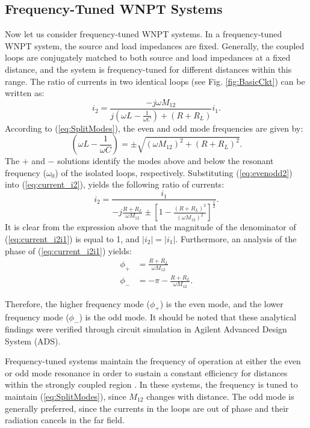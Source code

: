 \documentclass[journal]{IEEEtran}
\begin{document}
\subsection{Frequency-Tuned WNPT Systems}
\label{sec:FreqTune}

Now let us consider frequency-tuned WNPT systems. In a frequency-tuned WNPT system, the source and load impedances are fixed. Generally, the coupled loops are conjugately matched to both source and load impedances at a fixed distance, and the system is frequency-tuned for different distances within this range.
The ratio of currents in two identical loops (see Fig. \ref{fig:BasicCkt}) can be written as:
\begin{equation}
i_2 = \frac{-j \omega M_{12}}{j\left(\omega L - \frac{1}{\omega C}\right) + \left( R + R_L \right)}i_1.
\label{eq:current_i2}
\end{equation}
According to (\ref{eq:SplitModes}), the even and odd mode frequencies are given by:
\begin{equation}
\left(\omega L - \frac{1}{\omega C}\right) = \pm \sqrt{\left(\omega M_{12}\right)^2 + \left(R+R_L\right)^2}.
\label{eq:evenodd2}
\end{equation}
The $+$ and $-$ solutions identify the modes above and below the resonant frequency ($\omega_0$) of the isolated loops, respectively. Substituting (\ref{eq:evenodd2}) into (\ref{eq:current_i2}), yields the following ratio of currents:
\begin{equation}
i_2 = \frac{i_1}{-j\frac{R+R_L}{\omega M_{12}} \pm \left[1 - \frac{\left(R + R_L\right)^2}{\left(\omega M_{12}\right)^2}\right]^\frac{1}{2}}.
\label{eq:current_i2i1}
\end{equation}
 It is clear from the expression above that the magnitude of the denominator of (\ref{eq:current_i2i1}) is equal to 1, and $\left|i_2\right|=\left|i_1\right|$.
Furthermore, an analysis of the phase of (\ref{eq:current_i2i1}) yields:
\begin{align}
\phi_+ &= \frac{R+R_L}{\omega M_{12}} \label{eq:phi1} \\
\phi_- &= -\pi - \frac{R+R_L}{\omega M_{12}}. \label{eq:phi2}
\end{align}

Therefore, the higher frequency mode ($\phi_+$) is the even mode, and the lower frequency mode ($\phi_-$) is the odd mode. It should be noted that these analytical findings were verified through circuit simulation in Agilent Advanced Design System (ADS).

Frequency-tuned systems maintain the frequency of operation at either the even or odd mode resonance in order to sustain a constant efficiency for distances within the strongly coupled region \cite{Intel, Korea, VehicalPower, FreqTune-Exp}. In these systems, the frequency is tuned to maintain (\ref{eq:SplitModes}), since $M_{12}$ changes with distance. The odd mode is generally preferred, since the currents in the loops are out of phase and their radiation cancels in the far field.
\end{document}
